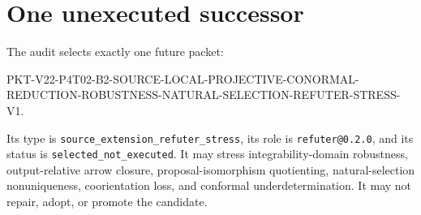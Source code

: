 \documentclass[11pt]{article}
\begin{document}
\section{One unexecuted successor}

The audit selects exactly one future packet:
\begin{center}
\small\ttfamily
PKT-V22-P4T02-B2-SOURCE-LOCAL-PROJECTIVE-CONORMAL-\\
REDUCTION-ROBUSTNESS-NATURAL-SELECTION-REFUTER-STRESS-V1.
\end{center}
Its type is \texttt{source\_extension\_refuter\_stress}, its role is
\texttt{refuter@0.2.0}, and its status is
\texttt{selected\_not\_executed}.  It may stress integrability-domain
robustness, output-relative arrow closure, proposal-isomorphism quotienting,
natural-selection nonuniqueness, coorientation loss, and conformal
underdetermination.  It may not repair, adopt, or promote the candidate.
\end{document}
